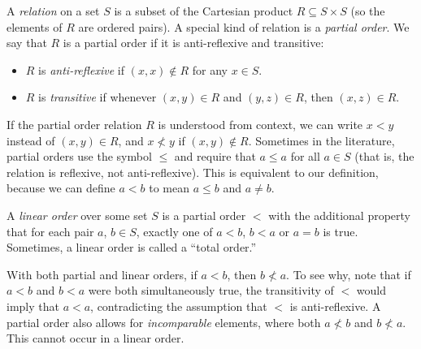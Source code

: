 \documentclass[../generics]{subfiles}
\begin{document}
\begin{definition}\label{def relation}
A \emph{relation} on a set $S$ is a subset of the Cartesian product $R\subseteq S\times S$ (so the elements of $R$ are ordered pairs). A special kind of relation is a \emph{partial order}. We say that $R$ is a partial order if it is anti-reflexive and transitive:
\begin{itemize}
\item $R$ is \emph{anti-reflexive} if $(x,x)\not\in R$ for any $x\in S$.
\item $R$ is \emph{transitive} if whenever $(x,y)\in R$ and $(y,z)\in R$, then $(x,z)\in R$.
\end{itemize}
If the partial order relation $R$ is understood from context, we can write $x<y$ instead of $(x,y)\in R$, and $x\not< y$ if $(x,y)\not\in R$. Sometimes in the literature, partial orders use the symbol $\le$ and require that $a\le a$ for all $a\in S$ (that is, the relation is reflexive, not anti-reflexive). This is equivalent to our definition, because we can define $a<b$ to mean $a\leq b$ and $a\neq b$.
\end{definition}

\begin{definition} A \emph{linear order} over some set $S$ is a partial order $<$ with the additional property that for each pair $a$, $b\in S$, exactly one of $a<b$, $b<a$ or $a=b$ is true. Sometimes, a linear order is called a ``total order.''
\end{definition}

With both partial and linear orders, if $a<b$, then $b\not< a$. To see why, note that if $a<b$ and $b<a$ were both simultaneously true, the transitivity of $<$ would imply that $a<a$, contradicting the assumption that $<$ is anti-reflexive. A partial order also allows for \emph{incomparable} elements, where both $a\not< b$ and $b\not< a$. This cannot occur in a linear order.
\end{document}
